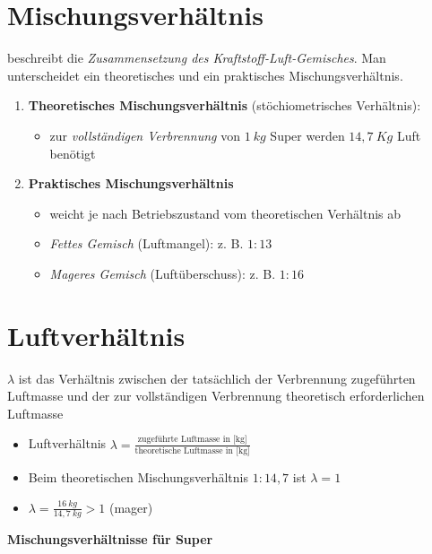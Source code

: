 \section{Mischungsverhältnis}\label{mischungsverhaeltnis}

beschreibt die \emph{Zusammensetzung des Kraftstoff-Luft-Gemisches}. Man
unterscheidet ein theoretisches und ein praktisches Mischungsverhältnis.

\begin{enumerate}
\item
  \textbf{Theoretisches Mischungsverhältnis} (stöchiometrisches
  Verhältnis):

  \begin{itemize}
  \item
    zur \emph{vollständigen Verbrennung} von $1~kg$ Super werden
    $14,7~Kg$ Luft benötigt
  \end{itemize}
\item
  \textbf{Praktisches Mischungsverhältnis}

  \begin{itemize}
  \item
    weicht je nach Betriebszustand vom theoretischen Verhältnis ab
  \item
    \emph{Fettes Gemisch} (Luftmangel): z. B. $1:13$
  \item
    \emph{Mageres Gemisch} (Luftüberschuss): z. B. $1:16$
  \end{itemize}
\end{enumerate}

\section{Luftverhältnis}\label{luftverhaeltnis}

$\lambda$ ist das Verhältnis zwischen der tatsächlich der Verbrennung
zugeführten Luftmasse und der zur vollständigen Verbrennung theoretisch
erforderlichen Luftmasse

\begin{itemize}
\item
  Luftverhältnis
  $\lambda = \frac{\text{zugeführte Luftmasse in [kg]}} {\text{theoretische Luftmasse in [kg]}}$
\item
  Beim theoretischen Mischungsverhältnis $1:14,7$ ist $\lambda = 1$
\item
  $\lambda = \frac{16~kg}{14,7~kg} > 1$ (mager)
\end{itemize}

\textbf{Mischungsverhältnisse für Super}

